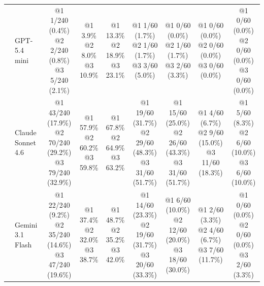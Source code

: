 \begin{table}[!t]
{\begin{tabular}{@{}llccccccc@{}}
& GPT-5.4 mini & \shortstack[l]{@1 1/240 (0.4\%)\\@2 2/240 (0.8\%)\\@3 5/240 (2.1\%)} & \shortstack[l]{@1 3.9\%\\@2 8.0\%\\@3 10.9\%} & \shortstack[l]{@1 13.3\%\\@2 18.9\%\\@3 23.1\%} & \shortstack[l]{@1 1/60 (1.7\%)\\@2 1/60 (1.7\%)\\@3 3/60 (5.0\%)} & \shortstack[l]{@1 0/60 (0.0\%)\\@2 1/60 (1.7\%)\\@3 2/60 (3.3\%)} & \shortstack[l]{@1 0/60 (0.0\%)\\@2 0/60 (0.0\%)\\@3 0/60 (0.0\%)} & \shortstack[l]{@1 0/60 (0.0\%)\\@2 0/60 (0.0\%)\\@3 0/60 (0.0\%)} \\
& Claude Sonnet 4.6 & \shortstack[l]{@1 43/240 (17.9\%)\\@2 70/240 (29.2\%)\\@3 79/240 (32.9\%)} & \shortstack[l]{@1 57.9\%\\@2 60.2\%\\@3 59.8\%} & \shortstack[l]{@1 67.8\%\\@2 64.9\%\\@3 63.2\%} & \shortstack[l]{@1 19/60 (31.7\%)\\@2 29/60 (48.3\%)\\@3 31/60 (51.7\%)} & \shortstack[l]{@1 15/60 (25.0\%)\\@2 26/60 (43.3\%)\\@3 31/60 (51.7\%)} & \shortstack[l]{@1 4/60 (6.7\%)\\@2 9/60 (15.0\%)\\@3 11/60 (18.3\%)} & \shortstack[l]{@1 5/60 (8.3\%)\\@2 6/60 (10.0\%)\\@3 6/60 (10.0\%)} \\
& Gemini 3.1 Flash & \shortstack[l]{@1 22/240 (9.2\%)\\@2 35/240 (14.6\%)\\@3 47/240 (19.6\%)} & \shortstack[l]{@1 37.4\%\\@2 32.0\%\\@3 38.7\%} & \shortstack[l]{@1 48.7\%\\@2 35.2\%\\@3 42.0\%} & \shortstack[l]{@1 14/60 (23.3\%)\\@2 19/60 (31.7\%)\\@3 20/60 (33.3\%)} & \shortstack[l]{@1 6/60 (10.0\%)\\@2 12/60 (20.0\%)\\@3 18/60 (30.0\%)} & \shortstack[l]{@1 2/60 (3.3\%)\\@2 4/60 (6.7\%)\\@3 7/60 (11.7\%)} & \shortstack[l]{@1 0/60 (0.0\%)\\@2 0/60 (0.0\%)\\@3 2/60 (3.3\%)} \\

\end{tabular}}
\end{table}

